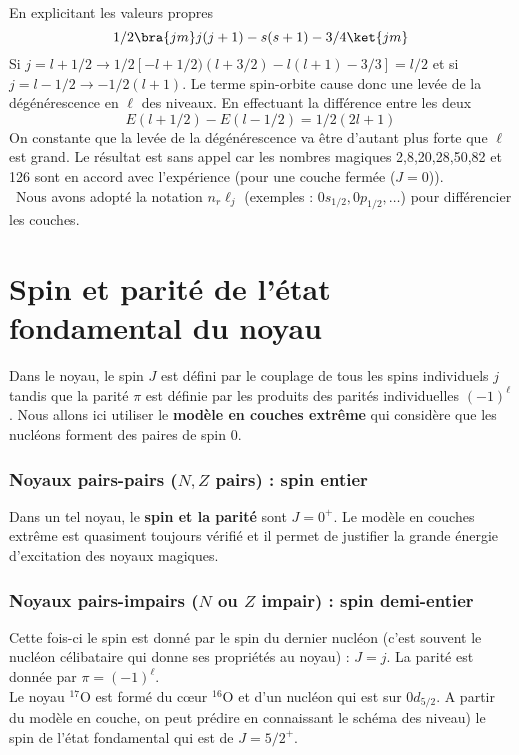  En explicitant les valeurs propres
\begin{equation}
1/2\bra{jm}  j(j+1)-s(s+1)-3/4  \ket{jm}
\end{equation}
Si $j = l+1/2 \rightarrow 1/2[-l+1/2)(l+3/2)-l(l+1)-3/3] = l/2$ et si $j=l-1/2 \rightarrow -1/2(l+1)$. Le 
terme spin-orbite cause donc une levée de la dégénérescence en $\ell$ des niveaux. En effectuant la différence
entre les deux
\begin{equation}
E(l+1/2)-E(l-1/2) = 1/2(2l+1)
\end{equation}
On constante que la levée de la dégénérescence va être d'autant plus forte que $\ell$ est grand. Le résultat est
sans appel car les nombres magiques 2,8,20,28,50,82 et 126 sont en accord avec l'expérience (pour une couche
fermée ($J=0$)).\\

\danger\ Nous avons adopté la notation $n_r \ell_j$ (exemples : $0s_{1/2}, 0p_{1/2},\dots$) pour différencier
les couches.


\section{Spin et parité de l'état fondamental du noyau}
Dans le noyau, le spin $J$ est défini par le couplage de tous les spins individuels $j$ tandis que la parité
$\pi$ est définie par les produits des parités individuelles $(-1)^\ell$. Nous allons ici utiliser le 
\textbf{modèle en couches extrême} qui considère que les nucléons forment des paires de spin 0.

\subsubsection*{Noyaux pairs-pairs ($N, Z$ pairs) : spin entier}
Dans un tel noyau, le \textbf{spin et la parité} sont $J=0^+$. Le modèle en couches extrême est quasiment
toujours vérifié et il permet de justifier la grande énergie d'excitation des noyaux magiques. 

\subsubsection*{Noyaux pairs-impairs ($N$ ou $Z$ impair) : spin demi-entier}
Cette fois-ci le spin est donné par le spin du dernier nucléon (c'est souvent le nucléon célibataire qui donne
ses propriétés au noyau) : $J=j$. La parité est donnée par $\pi = (-1)^\ell$.\\

Le noyau $^{17}$O est formé du cœur $^{16}$O et d'un nucléon qui est sur $0d_{5/2}$. A partir du modèle en couche,
on peut prédire en connaissant le schéma des niveau) le spin de l'état fondamental qui est de $J=5/2^+$.\\


